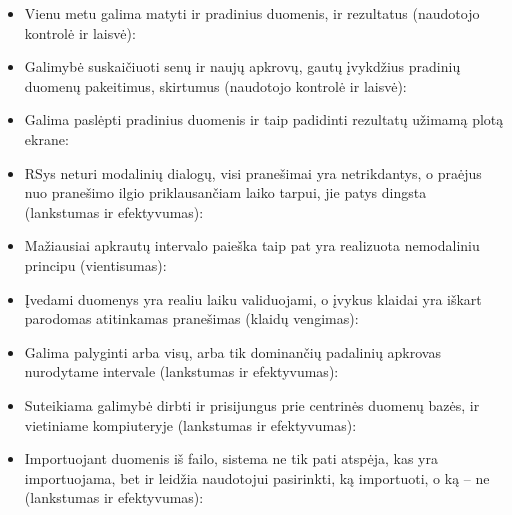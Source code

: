 \begin{itemize}
  \item Vienu metu galima matyti ir pradinius duomenis, ir rezultatus
  (naudotojo kontrolė ir laisvė):

  \item Galimybė suskaičiuoti senų ir naujų apkrovų, gautų įvykdžius pradinių
  duomenų pakeitimus, skirtumus (naudotojo kontrolė ir laisvė):

  \item Galima paslėpti pradinius duomenis ir taip padidinti rezultatų užimamą
  plotą ekrane:

  \item RSys neturi modalinių dialogų, visi pranešimai yra netrikdantys, o praėjus
    nuo pranešimo ilgio priklausančiam laiko tarpui, jie patys dingsta
    (lankstumas ir efektyvumas):

  \item Mažiausiai apkrautų intervalo paieška taip pat yra realizuota nemodaliniu principu
  (vientisumas):

  \item Įvedami duomenys yra realiu laiku validuojami, o įvykus klaidai yra iškart parodomas
  atitinkamas pranešimas (klaidų vengimas):

  \item Galima palyginti arba visų, arba tik dominančių padalinių apkrovas nurodytame intervale
  (lankstumas ir efektyvumas):

  \item Suteikiama galimybė dirbti ir prisijungus prie centrinės duomenų bazės, ir vietiniame
  kompiuteryje (lankstumas ir efektyvumas):

  \item
    Importuojant duomenis iš failo, sistema ne tik pati atspėja, kas
    yra importuojama, bet ir leidžia naudotojui pasirinkti, ką
    importuoti, o ką – ne (lankstumas ir efektyvumas):


\end{itemize}
